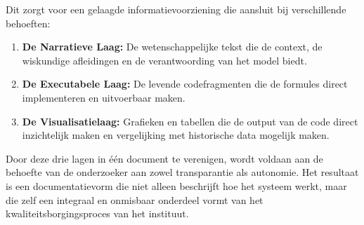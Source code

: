 Dit zorgt voor een gelaagde informatievoorziening die aansluit bij verschillende behoeften:
\begin{enumerate}
    \item \textbf{De Narratieve Laag:} De wetenschappelijke tekst die de context, de wiskundige afleidingen en de verantwoording van het model biedt.
    \item \textbf{De Executabele Laag:} De levende codefragmenten die de formules direct implementeren en uitvoerbaar maken.
    \item \textbf{De Visualisatielaag:} Grafieken en tabellen die de output van de code direct inzichtelijk maken en vergelijking met historische data mogelijk maken.
\end{enumerate}
Door deze drie lagen in één document te verenigen, wordt voldaan aan de behoefte van de onderzoeker aan zowel transparantie als autonomie. Het resultaat is een documentatievorm die niet alleen beschrijft hoe het systeem werkt, maar die zelf een integraal en onmisbaar onderdeel vormt van het kwaliteitsborgingsproces van het instituut.
